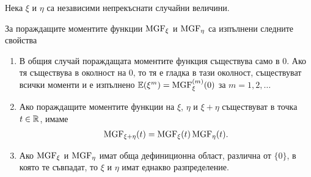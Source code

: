 \documentclass[numbers=endperiod, bibliography=totocnumbered]{scrartcl}
\begin{document}
\begin{theorem}\label{thm:mgf-props}
  Нека \( \xi \) и \( \eta \) са независими непрекъснати случайни величини.

  За пораждащите моментите функции \( \operatorname{MGF}_\xi \) и \( \operatorname{MGF}_\eta \) са изпълнени следните свойства
  \begin{enumerate}
    \item В общия случай пораждащата моментите функция съществува само в \( 0 \). Ако тя съществува в околност на \( 0 \), то тя е гладка в тази околност, съществуват всички моменти и е изпълнено \( \mathbb{E}(\xi^m) = \operatorname{MGF}_\xi^{(m)} (0) \) за \( m = 1, 2, \ldots \)

    \item Ако пораждащите моментите функции на \( \xi \), \( \eta \) и \( \xi + \eta \) съществуват в точка \( t \in \mathbb{R} \), имаме
    \begin{align*}
      \operatorname{MGF}_{\xi + \eta}(t) = \operatorname{MGF}_\xi(t) \operatorname{MGF}_\eta(t).
    \end{align*}

    \item Ако \( \operatorname{MGF}_\xi \) и \( \operatorname{MGF}_\eta \) имат обща дефиниционна област, различна от \( \{ 0 \} \), в която те съвпадат, то \( \xi \) и \( \eta \) имат еднакво разпределение.
  \end{enumerate}
\end{theorem}
\end{document}
